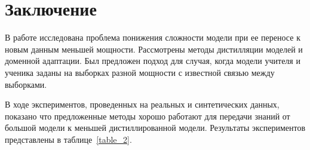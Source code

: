 \newpage
\section{Заключение}

\begin{table}[h!t]
\begin{center}
\caption{Результаты экспериментов}
\label{table_2}
\end{center}
\end{table}

В работе исследована проблема понижения сложности модели при ее переносе к новым данным меньшей мощности.
Рассмотрены методы дистилляции моделей и доменной адаптации.
Был предложен подход для случая, когда модели учителя и ученика заданы на выборках разной мощности с известной связью между выборками.

В ходе экспериментов, проведенных на реальных и синтетических данных, показано что предложенные методы хорошо работают для передачи знаний от большой модели к меньшей дистиллированной модели.
Результаты экспериментов представлены в таблице~\ref{table_2}.
